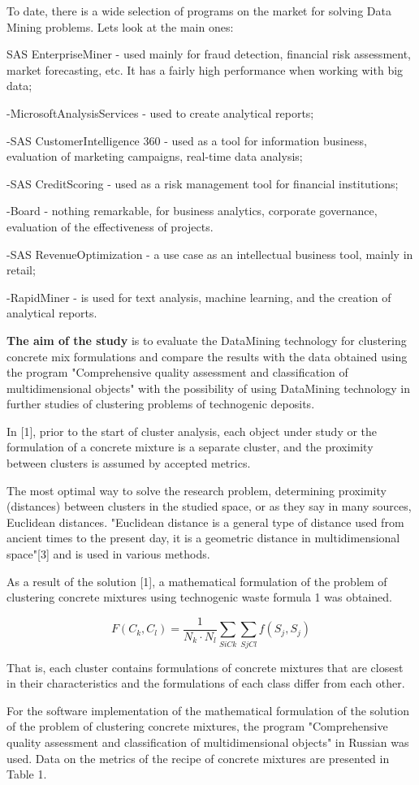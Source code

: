 \begin{multicols}{2}
To date, there is a wide selection of programs on the market for solving
Data Mining problems. Let\textquotesingle s look at the main ones:

SAS EnterpriseMiner - used mainly for fraud detection, financial risk
assessment, market forecasting, etc. It has a fairly high performance
when working with big data;

-MicrosoftAnalysisServices - used to create analytical reports;

-SAS CustomerIntelligence 360 - used as a tool for information
business, evaluation of marketing campaigns, real-time data analysis;

-SAS CreditScoring - used as a risk management tool for financial
institutions;

-Board - nothing remarkable, for business analytics, corporate
governance, evaluation of the effectiveness of projects.

-SAS RevenueOptimization - a use case as an intellectual business
tool, mainly in retail;

-RapidMiner - is used for text analysis, machine learning, and the
creation of analytical reports.

{\bfseries The aim of the study} is to evaluate the DataMining technology
for clustering concrete mix formulations and compare the results with
the data obtained using the program "Comprehensive quality assessment
and classification of multidimensional objects" with the possibility of
using DataMining technology in further studies of clustering problems of
technogenic deposits.

In {[}1{]}, prior to the start of cluster analysis, each object under
study or the formulation of a concrete mixture is a separate cluster,
and the proximity between clusters is assumed by accepted metrics.

The most optimal way to solve the research problem, determining
proximity (distances) between clusters in the studied space, or as they
say in many sources, Euclidean distances. "Euclidean distance is a
general type of distance used from ancient times to the present day, it
is a geometric distance in multidimensional space"{[}3{]} and is used in
various methods.

As a result of the solution {[}1{]}, a mathematical formulation of the
problem of clustering concrete mixtures using technogenic waste formula
1 was obtained.

\begin{equation}
F(C_k, C_l) = \frac{1}{{N_k \cdot N_l}} \sum\limits_{SiCk} \sum\limits_{SjCl} f(S_j, S_j)
\end{equation}

That is, each cluster contains formulations of concrete mixtures that
are closest in their characteristics and the formulations of each class
differ from each other.

For the software implementation of the mathematical formulation of the
solution of the problem of clustering concrete mixtures, the program
"Comprehensive quality assessment and classification of multidimensional
objects" in Russian was used. Data on the metrics of the recipe of
concrete mixtures are presented in Table 1.
\end{multicols}

